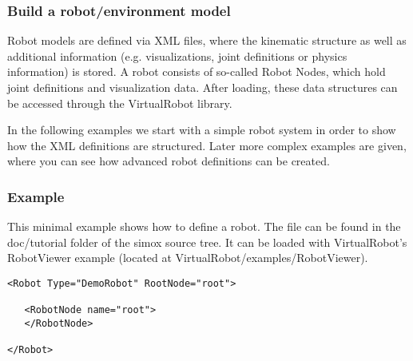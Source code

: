 \subsubsection{Build a robot/environment model}
Robot models are defined via XML files, where the kinematic structure as well as additional information (e.g. visualizations, joint definitions or physics information) is stored. A robot consists of so-called Robot Nodes, which hold joint definitions and visualization data. After loading, these data structures can be accessed through the VirtualRobot library.\par In the following examples we start with a simple robot system in order to show how the XML definitions are structured. Later more complex examples are given, where you can see how advanced robot definitions can be created. \par
\subsubsection*{Example}
\par
This minimal example shows how to define a robot. The file can be found in the doc/tutorial folder of the simox source tree. It can be loaded with VirtualRobot's RobotViewer example (located at VirtualRobot/examples/RobotViewer). 
\par
\begin{lstlisting}
<Robot Type="DemoRobot" RootNode="root">

   <RobotNode name="root">
   </RobotNode>

</Robot>
\end{lstlisting}
\par
